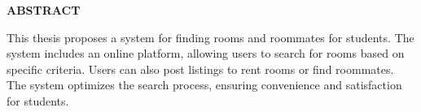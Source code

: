 \documentclass[../Main.tex]{subfiles}
\begin{document}
\begin{center}
    \Large{\textbf{ABSTRACT}}\\
\end{center}
\vspace{1cm}
This thesis proposes a system for finding rooms and roommates for students.
The system includes an online platform, allowing users to search for rooms based on specific criteria.
Users can also post listings to rent rooms or find roommates.
The system optimizes the search process, ensuring convenience and satisfaction for students.

\begin{flushright}

\end{flushright}
\end{document}
